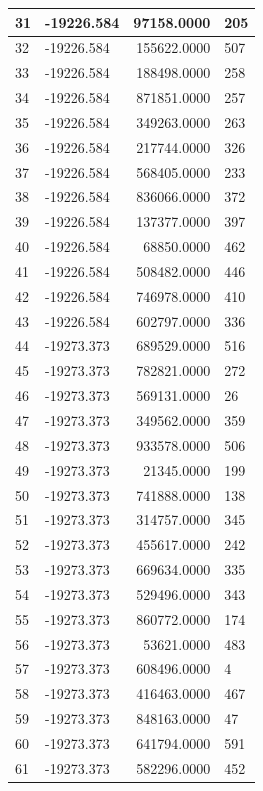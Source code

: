 \documentclass[]{book}
\theoremstyle{definition}
\theoremstyle{definition}
\theoremstyle{definition}
\theoremstyle{remark}
\begin{document}
\begin{tabular}{l|l|r|l}
\hline
31 & -19226.584 & 97158.0000 & 205\\
\hline
32 & -19226.584 & 155622.0000 & 507\\
\hline
33 & -19226.584 & 188498.0000 & 258\\
\hline
34 & -19226.584 & 871851.0000 & 257\\
\hline
35 & -19226.584 & 349263.0000 & 263\\
\hline
36 & -19226.584 & 217744.0000 & 326\\
\hline
37 & -19226.584 & 568405.0000 & 233\\
\hline
38 & -19226.584 & 836066.0000 & 372\\
\hline
39 & -19226.584 & 137377.0000 & 397\\
\hline
40 & -19226.584 & 68850.0000 & 462\\
\hline
41 & -19226.584 & 508482.0000 & 446\\
\hline
42 & -19226.584 & 746978.0000 & 410\\
\hline
43 & -19226.584 & 602797.0000 & 336\\
\hline
44 & -19273.373 & 689529.0000 & 516\\
\hline
45 & -19273.373 & 782821.0000 & 272\\
\hline
46 & -19273.373 & 569131.0000 & 26\\
\hline
47 & -19273.373 & 349562.0000 & 359\\
\hline
48 & -19273.373 & 933578.0000 & 506\\
\hline
49 & -19273.373 & 21345.0000 & 199\\
\hline
50 & -19273.373 & 741888.0000 & 138\\
\hline
51 & -19273.373 & 314757.0000 & 345\\
\hline
52 & -19273.373 & 455617.0000 & 242\\
\hline
53 & -19273.373 & 669634.0000 & 335\\
\hline
54 & -19273.373 & 529496.0000 & 343\\
\hline
55 & -19273.373 & 860772.0000 & 174\\
\hline
56 & -19273.373 & 53621.0000 & 483\\
\hline
57 & -19273.373 & 608496.0000 & 4\\
\hline
58 & -19273.373 & 416463.0000 & 467\\
\hline
59 & -19273.373 & 848163.0000 & 47\\
\hline
60 & -19273.373 & 641794.0000 & 591\\
\hline
61 & -19273.373 & 582296.0000 & 452\\

\end{tabular}
\end{document}
